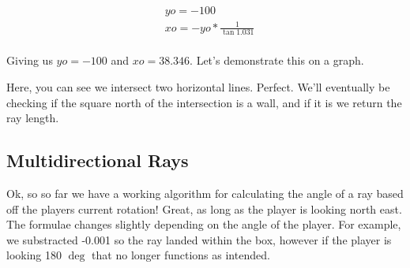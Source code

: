 \documentclass{article}
\begin{document}
\begin{equation}
    \begin{split}
        & yo = -100 \\
        & xo = -yo * \frac{1}{\tan 1.031} \\
    \end{split}
\end{equation}

Giving us $yo = -100$ and $xo = 38.346$. Let's demonstrate this on a graph.

\begin{center}
\end{center}

Here, you can see we intersect two horizontal lines. Perfect. We'll eventually be checking 
if the square north of the intersection is a wall, and if it is we return the ray length.

\subsection{Multidirectional Rays}

Ok, so so far we have a working algorithm for calculating the angle of a ray based off the
players current rotation! Great, as long as the player is looking north east. The formulae changes
slightly depending on the angle of the player. For example, we substracted -0.001 so the ray landed 
within the box, however if the player is looking 180 $\deg$ that no longer functions as intended.
\end{document}
